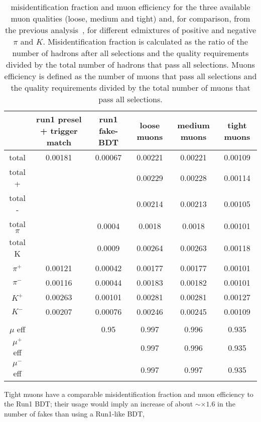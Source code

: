 \begin{table}[h]
  \begin{center}
    \begin{tabular}{| c | c | c | c | c | c |}
      \hline
      &run1 presel + trigger match&run1 fake-BDT&loose muons&medium muons&tight muons\\ \hline
      total&0.00181&0.00067&0.00221&0.00221&0.00109\\ \hline
      total +&&&0.00229&0.00228&0.00114\\ \hline
      total -&&&0.00214&0.00213&0.00105\\ \hline
      total $\pi$&&0.0004&0.0018&0.0018&0.00101\\ \hline
      total K&&0.0009&0.00264&0.00263&0.00118\\ \hline
      $\pi^+$&0.00121&0.00042&0.00177&0.00177&0.00101\\ \hline
      $\pi^-$&0.00116&0.00044&0.00183&0.00182&0.00101\\ \hline
      $K^+$&0.00263&0.00101&0.00281&0.00281&0.00127\\ \hline
      $K^-$&0.00207&0.00076&0.00246&0.00245&0.00109\\ \hline
      &&&&&\\ \hline
      $\mu$ eff&&0.95&0.997&0.996&0.935\\ \hline
      $\mu^+$ eff&&&0.997&0.996&0.935\\ \hline
      $\mu^-$ eff&&&0.997&0.997&0.935\\ \hline
    \end{tabular}
    \caption{misidentification fraction and muon efficiency for the three 
      available muon qualities (loose, medium and tight) and, for comparison, 
      from the previous analysis~\cite{Alpigiani:1756291}, for different edmixtures of positive and negative $\pi$ and $K$.
      Misidentification fraction is calculated as the ratio of the number 
      of hadrons after all selections and the quality requirements divided 
      by the total number of hadrons that pass all selections. Muons 
      efficiency is defined as the number of muons that pass all selections and the quality requirements divided
      by the total number of muons that pass all selections.}
    \label{table:misidentfraction}  
  \end{center}
\end{table}
Tight muons have a comparable misidentification fraction and muon efficiency to the Run1 BDT; their usage would 
imply an increase of about $\sim \times 1.6$ in the number of fakes than using a Run1-like BDT, 
